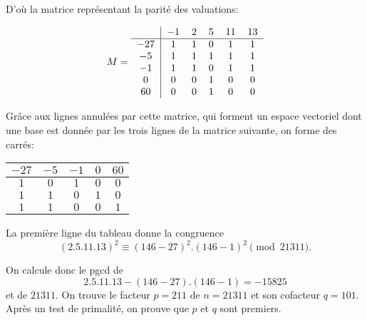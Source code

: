 \documentclass[french, 12pt, titlepage]{article}
\begin{document}
D'où la matrice représentant la parité des valuations:

\[ M = 
\begin{tabular}{c|ccccc}
 & $-1$ & $2$ & $5$ & $11$ & $13$\\
\hline
$-27$ & $1$ & $1$ & $0$ & $1$ & $1$\\
$ -5$ & $1$ & $1$ & $1$ & $1$ & $1$\\
$-1$ & $1$ & $1$ & $0$ & $1$ & $1$\\
$0$ & $0$ & $0$ & $1$ & $0$ & $0$\\
$60$ & $0$ & $0$ & $1$ & $0$ & $0$\\
\end{tabular}
\]

Grâce aux lignes annulées par cette matrice, qui forment un espace vectoriel dont une base est donnée par les trois lignes de la matrice suivante, on forme des carrés:

\begin{center}
\begin{tabular}{ccccc}
 $-27$ & $-5$ & $-1$ & $0$ & $60$\\
\hline
$1$ & $0$ & $1$ & $0$ & $0$\\
$1$ & $1$ & $0$ & $1$ & $0$\\
$1$ & $1$ & $0$ & $0$ & $1$\\
\end{tabular}
\end{center}

La première ligne du tableau donne la congruence \[ (2.5.11.13)^2 \equiv (146 - 27)^2.(146 - 1)^2 \pmod{21311} .\]

On calcule donc le pgcd de \[ 2.5.11.13 - (146 - 27).(146 - 1) = -15825 \] et de $21311.$ On trouve le facteur $p = 211$ de $n = 21311$ et son cofacteur $q = 101.$
Après un test de primalité, on prouve que $p$ et $q$ sont premiers.  
\end{document}
